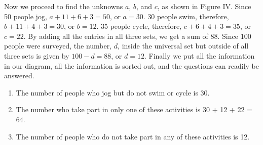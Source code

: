 \begin{solution}
    Now we proceed to find the unknowns \( a \), \( b \), and \( c \), as shown in Figure IV. Since 50 people jog, \( a + 11 + 6 + 3 = 50 \), or \( a = 30 \). 30 people swim, therefore, \( b + 11 + 4 + 3 = 30 \), or \( b = 12 \). 35 people cycle, therefore, \( c + 6 + 4 + 3 = 35 \), or \( c = 22 \). By adding all the entries in all three sets, we get a sum of 88. Since 100 people were surveyed, the number, $d$, inside the universal set but outside of all three sets is given by $100 -d = 88$, or $d = 12$. Finally we put all the information in our diagram, all the information is sorted out, and the questions can readily be answered.

    \begin{center}
        \begin{venndiagram3sets}[
                labelA=\(J\),
                labelB=\(S\),
                labelC=\(C\),
                labelABC={3},
                labelOnlyAB={11},
                labelOnlyBC={4},
                labelOnlyAC={6},
                labelOnlyA={30},
                labelOnlyB={12},
                labelOnlyC={22},
            ]
        \end{venndiagram3sets}
    \end{center}

    \begin{enumerate}
        \item The number of people who jog but do not swim or cycle is 30.
        \item The number who take part in only one of these activities is 30 + 12 + 22 = 64.
        \item The number of people who do not take part in any of these activities is 12.
    \end{enumerate}

\end{solution}